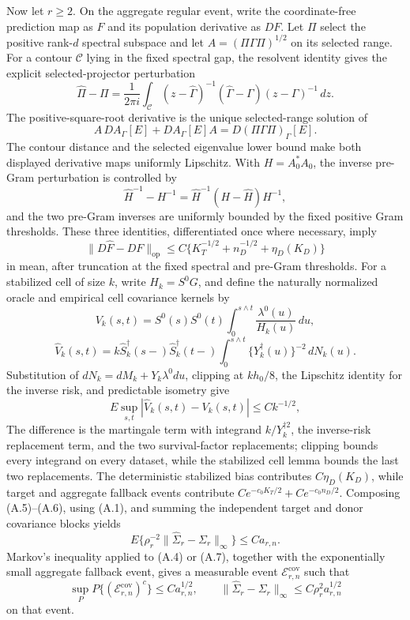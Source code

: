 Now let \(r\ge2\). On the aggregate regular event, write the coordinate-free prediction map as \(F\) and its population derivative as \(DF\). Let \(\Pi\) select the positive rank-\(d\) spectral subspace and let \(A=(\Pi\Gamma\Pi)^{1/2}\) on its selected range. For a contour \(\mathscr C\) lying in the fixed spectral gap, the resolvent identity gives the explicit selected-projector perturbation
\[
 \widehat\Pi-\Pi
 =\frac{1}{2\pi i}\int_{\mathscr C}
 (z-\widehat\Gamma)^{-1}(\widehat\Gamma-\Gamma)
 (z-\Gamma)^{-1}\,dz.
\]
The positive-square-root derivative is the unique selected-range solution of
\[
 A\,DA_\Gamma[E]+DA_\Gamma[E]A
 =D(\Pi\Gamma\Pi)_\Gamma[E].
\]
The contour distance and the selected eigenvalue lower bound make both displayed derivative maps uniformly Lipschitz. With \(H=A_0^*A_0\), the inverse pre-Gram perturbation is controlled by
\[
 \widehat H^{-1}-H^{-1}
 =\widehat H^{-1}(H-\widehat H)H^{-1},
\]
and the two pre-Gram inverses are uniformly bounded by the fixed positive Gram thresholds. These three identities, differentiated once where necessary, imply
\[
 \|D\widehat F-DF\|_{\mathrm{op}}
 \le C\{K_T^{-1/2}+n_D^{-1/2}+\eta_D(K_D)\}              \tag{A.5}
\]
in mean, after truncation at the fixed spectral and pre-Gram thresholds. For a stabilized cell of size \(k\), write \(H_k=S^0G\), and define the naturally normalized oracle and empirical cell covariance kernels by
\[
 V_k(s,t)=S^0(s)S^0(t)\int_0^{s\wedge t}
 \frac{\lambda^0(u)}{H_k(u)}\,du,
\]
\[
 \widehat V_k(s,t)=k\widehat S_k^\dagger(s-)
 \widehat S_k^\dagger(t-)
 \int_0^{s\wedge t}\{Y_k^\dagger(u)\}^{-2}\,dN_k(u).
\]
Substitution of \(dN_k=dM_k+Y_k\lambda^0du\), clipping at \(kh_0/8\), the Lipschitz identity for the inverse risk, and predictable isometry give
\[
 E\sup_{s,t}\left|\widehat V_k(s,t)-V_k(s,t)\right|
 \le Ck^{-1/2},                                           \tag{A.6}
\]
The difference is the martingale term with integrand \(k/Y_k^{\dagger 2}\), the inverse-risk replacement term, and the two survival-factor replacements; clipping bounds every integrand on every dataset, while the stabilized cell lemma bounds the last two replacements. The deterministic stabilized bias contributes \(C\eta_D(K_D)\), while target and aggregate fallback events contribute \(Ce^{-c_0K_T/2}+Ce^{-c_0n_D/2}\). Composing (A.5)--(A.6), using (A.1), and summing the independent target and donor covariance blocks yields
\[
 E\{\rho_r^{-2}\|\widehat\Sigma_r-\Sigma_r\|_\infty\}
 \le Ca_{r,n}.                                            \tag{A.7}
\]
Markov's inequality applied to (A.4) or (A.7), together with the exponentially small aggregate fallback event, gives a measurable event \(\mathcal E_{r,n}^{\mathrm{cov}}\) such that
\[
 \sup_PP\{(\mathcal E_{r,n}^{\mathrm{cov}})^c\}\le Ca_{r,n}^{1/2},
 \qquad
 \|\widehat\Sigma_r-\Sigma_r\|_\infty
 \le C\rho_r^2a_{r,n}^{1/2}                              \tag{A.8}
\]
on that event.

